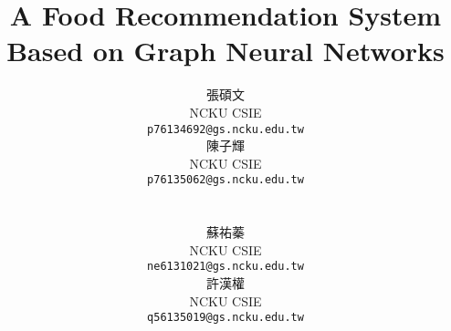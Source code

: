 \documentclass[10pt,twocolumn,letterpaper]{article}
\title{A Food Recommendation System Based on Graph Neural Networks}
\author{
\begin{minipage}{0.45\textwidth}
\centering
張碩文\\
NCKU CSIE\\
{\tt\small p76134692@gs.ncku.edu.tw}
\end{minipage}
\hfill
\begin{minipage}{0.45\textwidth}
\centering
陳子輝\\
NCKU CSIE\\
{\tt\small p76135062@gs.ncku.edu.tw}
\end{minipage}
\\[1.5cm] %
\begin{minipage}{0.45\textwidth}
\centering
蘇祐蓁\\
NCKU CSIE\\
{\tt\small ne6131021@gs.ncku.edu.tw}
\end{minipage}
\hfill
\begin{minipage}{0.45\textwidth}
\centering
許漢權\\
NCKU CSIE\\
{\tt\small q56135019@gs.ncku.edu.tw}
\end{minipage}
}
\begin{document}
\begin{CJK}{UTF8}{bkai}  %

\maketitle
    




{
    \small
    
    
}

\end{CJK}  %
\end{document}
